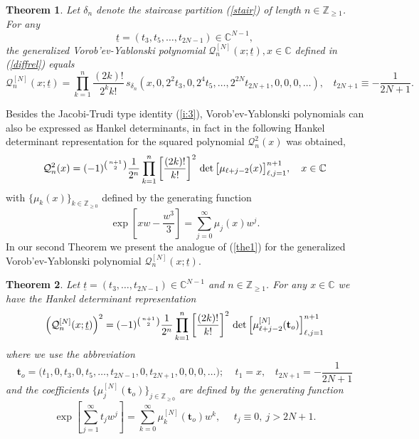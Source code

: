 \documentclass[10pt,reqno,oneside]{amsart}
\numberwithin{equation}{section}
\newtheorem{theo}{Theorem}[section]
\def\le{\left}
\def\ri{\right}
\def\un{\underline}
\def\bt{\begin{theo}}
\def\be{\begin{equation}}
\def\ee{\end{equation}}
\def\eqref#1{(\ref{#1})}
\def\bt{{\mathbf t}}
\def\binom#1#2{\le({#1 \atop #2}\ri)}
\begin{document}
\begin{theo}\label{small} Let $\delta_n$ denote the staircase partition \eqref{stair} of length $n\in\mathbb{Z}_{\geq 1}$. For any 
\begin{equation*}
	\un t=(t_3,t_5,\ldots,t_{2N-1})\in\mathbb{C}^{N-1},
\end{equation*}
the generalized Vorob'ev-Yablonski polynomial $\mathcal{Q}_n^{[N]}(x;\un t),x\in\mathbb{C}$ defined in \eqref{diffrel} equals
\begin{equation}\label{Schurid}
	\mathcal{Q}_n^{[N]}(x;\un t)=\prod_{k=1}^n\frac{(2k)!}{2^kk!}\,s_{\delta_n}\left(x,0,2^2t_3,0,2^4t_5,\ldots,2^{2N}t_{2N+1},0,0,0,\ldots\right),\ \ \ \ t_{2N+1}\equiv -\frac{1}{2N+1}.
\end{equation}
\end{theo}
Besides the Jacobi-Trudi type identity \eqref{i:3}, Vorob'ev-Yablonski polynomials can also be expressed as Hankel determinants, in fact in \cite{BB} the following Hankel determinant representation for the squared polynomial $\mathcal{Q}_n^2(x)$ was obtained,
\be\label{the1}
  \mathcal{Q}_{n}^2(x) = (-1)^{\binom{n+1}{2}}\frac{1}{2^{n}}\prod_{k=1}^{n}\left[\frac{(2k)!}{k!}\right]^2\,\det\big[\mu_{\ell+j-2}(x)\big]_{\ell,j=1}^{n+1},\ \ \ x\in\mathbb{C}
\ee
with $\{\mu_k(x)\}_{k\in\mathbb{Z}_{\geq 0}}$ defined by the generating function
\begin{equation*}
	\exp\left[xw -\frac {w^3}3\right] =\sum_{j=0}^\infty \mu_j(x) w^j.
\end{equation*}
In our second Theorem we present the analogue of \eqref{the1} for the generalized Vorob'ev-Yablonski polynomial $\mathcal{Q}_n^{[N]}(x;\un t)$.
\begin{theo}\label{Fesq} Let $\un t=(t_3,\ldots,t_{2N-1})\in\mathbb{C}^{N-1}$ and $n\in\mathbb{Z}_{\geq 1}$. For any $x\in\mathbb{C}$ we have the Hankel determinant representation
\begin{equation}\label{Fesqid}
	\Big(\mathcal{Q}_n^{[N]}(x;\un t)\Big)^2=(-1)^{\binom{n+1}{2}}\frac{1}{2^{n}}\prod_{k=1}^{n}\left[\frac{(2k)!}{k!}\right]^2\,\det\Big[\mu_{\ell+j-2}^{[N]}(\bt_o)\Big]_{\ell,j=1}^{n+1}
\end{equation}
where we use the abbreviation
\begin{equation*}
	\bt_o=\big(t_1,0,t_3,0,t_5,\ldots,t_{2N-1},0,t_{2N+1},0,0,0,\ldots\big);\ \ \ \ \ t_1=x,\ \ \ \ t_{2N+1}=-\frac{1}{2N+1}
\end{equation*}
and the coefficients $\{\mu_j^{[N]}(\bt_o)\}_{j\in\mathbb{Z}_{\geq 0}}$ are defined by the generating function
\begin{equation}\label{muk}
	\exp\left[\sum_{j=1}^{\infty}t_jw^j\right]=\sum_{k=0}^{\infty}\mu_k^{[N]}(\bt_o)w^k,\ \ \ \ \ \ t_j\equiv 0,\ j>2N+1.
\end{equation}
\end{theo}
\end{document}
